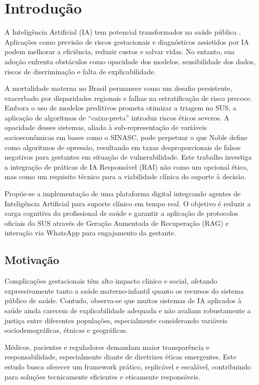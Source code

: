 \documentclass[12pt]{article}
\begin{document}
\section{Introdução}

A Inteligência Artificial (IA) tem potencial transformador na saúde pública \cite{Shneiderman2021, Cabitza2022}. Aplicações como previsão de riscos gestacionais \cite{Advancing2025, MachineLearning2022} e diagnósticos assistidos por IA podem melhorar a eficiência, reduzir custos e salvar vidas. No entanto, sua adoção enfrenta obstáculos como opacidade dos modelos, sensibilidade dos dados, riscos de discriminação e falta de explicabilidade.

A mortalidade materna no Brasil permanece como um desafio persistente, exacerbado por disparidades regionais e falhas na estratificação de risco precoce. Embora o uso de modelos preditivos prometa otimizar a triagem no SUS, a aplicação de algoritmos de “caixa-preta” introduz riscos éticos severos. A opacidade desses sistemas, aliada à sub-representação de variáveis socioeconômicas em bases como o SINASC, pode perpetuar o que Noble \cite{Noble2018} define como algoritmos de opressão, resultando em taxas desproporcionais de falsos negativos para gestantes em situação de vulnerabilidade. Este trabalho investiga a integração de práticas de IA Responsável (RAI) não como um opcional ético, mas como um requisito técnico para a viabilidade clínica do suporte à decisão.

Propõe-se a implementação de uma plataforma digital integrando agentes de Inteligência Artificial para suporte clínico em tempo real. O objetivo é reduzir a carga cognitiva do profissional de saúde e garantir a aplicação de protocolos oficiais do SUS através de Geração Aumentada de Recuperação (RAG) e interação via WhatsApp para engajamento da gestante.

\subsection{Motivação}
Complicações gestacionais têm alto impacto clínico e social, afetando expressivamente tanto a saúde materno-infantil quanto os recursos do sistema público de saúde. Contudo, observa-se que muitos sistemas de IA aplicados à saúde ainda carecem de explicabilidade adequada e não avaliam robustamente a justiça entre diferentes populações, especialmente considerando variáveis sociodemográficas, étnicas e geográficas.

Médicos, pacientes e reguladores demandam maior transparência e responsabilidade, especialmente diante de diretrizes éticas emergentes. Este estudo busca oferecer um framework prático, replicável e escalável, contribuindo para soluções tecnicamente eficientes e eticamente responsáveis.
\end{document}
